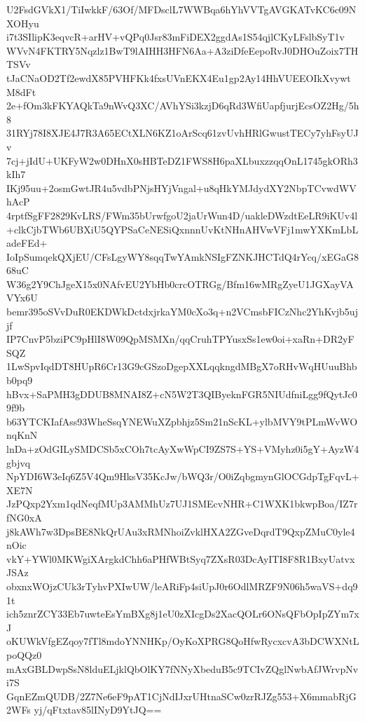 U2FsdGVkX1/TiIwkkF/63Of/MFDsclL7WWBqa6hYhVVTgAVGKATvKC6c09NXOHyu
i7t3SIlipK3eqvcR+arHV+vQPq0Jsr83mFiDEX2ggdAs1S54qjlCKyLFslbSyT1v
WVvN4FKTRY5Nqzlz1BwT9lAIHH3HFN6Aa+A3ziDfeEepoRvJ0DHOuZoix7THTSVv
tJaCNaOD2Tf2ewdX85PVHFKk4fxsUVnEKX4Eu1gp2Ay14HhVUEEOIkXvywtM8dFt
2e+fOm3kFKYAQkTa9nWvQ3XC/AVhYSi3kzjD6qRd3WfiUapfjurjEcsOZ2Hg/5h8
31RYj78I8XJE4J7R3A65ECtXLN6KZ1oArScq61zvUvhHRlGwustTECy7yhFsyUJv
7cj+jIdU+UKFyW2w0DHnX0sHBTeDZ1FWS8H6paXLbuxzzqqOnL1745gkORh3kIh7
IKj95uu+2osmGwtJR4u5vdbPNjsHYjVngal+u8qHkYMJdydXY2NbpTCvwdWVhAcP
4rptfSgFF2829KvLRS/FWm35bUrwfgoU2jaUrWun4D/uakleDWzdtEeLR9iKUv4l
+clkCjbTWb6UBXiU5QYPSaCeNESiQxnnnUvKtNHnAHVwVFj1mwYXKmLbLadeFEd+
IoIpSumqekQXjEU/CFsLgyWY8sqqTwYAmkNSIgFZNKJHCTdQ4rYcq/xEGaG868uC
W36g2Y9ChJgeX15x0NAfvEU2YbHb0crcOTRGg/Bfm16wMRgZyeU1JGXayVAVYx6U
bemr395oSVvDuR0EKDWkDctdxjrkaYM0cXo3q+n2VCmsbFICzNhc2YhKvjb5ujjf
IP7CnvP5bziPC9pHlI8W09QpMSMXn/qqCruhTPYusxSs1ew0oi+xaRn+DR2yFSQZ
1LwSpvIqdDT8HUpR6Cr13G9cGSzoDgepXXLqqkngdMBgX7oRHvWqHUuuBhbb0pq9
hBvx+SaPMH3gDDUB8MNAI8Z+cN5W2T3QIByeknFGR5NIUdfniLgg9fQytJc09f9b
b63YTCKIafAss93WheSsqYNEWuXZpbhjz5Sm21nScKL+ylbMVY9tPLmWvWOnqKnN
lnDa+zOdGILySMDCSb5xCOh7tcAyXwWpCI9ZS7S+YS+VMyhz0i5gY+AyzW4gbjvq
NpYDI6W3eIq6Z5V4Qm9HksV35KcJw/bWQ3r/O0iZqbgmynGlOCGdpTgFqvL+XE7N
JzPQxp2Yxm1qdNeqfMUp3AMMhUz7UJ1SMEcvNHR+C1WXK1bkwpBoa/IZ7rfNG0xA
j8kAWh7w3DpsBE8NkQrUAu3xRMNhoiZvklHXA2ZGveDqrdT9QxpZMuC0yle4nOic
vkY+YWl0MKWgiXArgkdChh6aPHfWBtSyq7ZXsR03DcAyITI8F8R1BxyUatvxJSAz
obxnxWOjzCUk3rTyhvPXIwUW/leARiFp4siUpJ0r6OdlMRZF9N06h5waVS+dq91t
ich5znrZCY33Eb7uwteEsYmBXg8j1eU0zXIcgDs2XacQOLr6ONsQFbOpIpZYm7xJ
oKUWkVfgEZqoy7fTl8mdoYNNHKp/OyKoXPRG8QoHfwRycxcvA3bDCWXNtLpoQQz0
mAxGBLDwpSsN8lduELjklQbOlKY7fNNyXbeduB5c9TCIvZQglNwbAfJWrvpNvi7S
GqnEZmQUDB/2Z7Ne6eF9pAT1CjNdIJxrUHtnaSCw0zrRJZg553+X6mmabRjG2WFs
yj/qFtxtav85lINyD9YtJQ==
